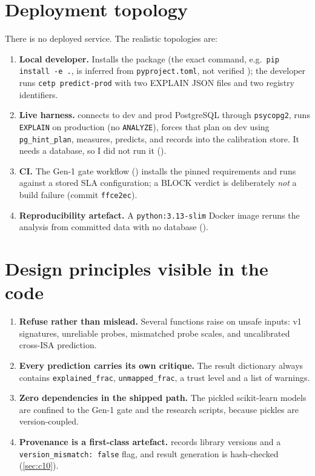 \section{Deployment topology}
There is no deployed service. The realistic topologies are:
\begin{enumerate}
\item \textbf{Local developer.} Installs the package (the exact command, e.g.\ \texttt{pip install -e .}, is inferred from \texttt{pyproject.toml}, not verified \evUNK); the developer runs \texttt{cetp predict-prod}
  with two EXPLAIN JSON files and two registry identifiers.
\item \textbf{Live harness.}  connects to dev and prod
  PostgreSQL through \texttt{psycopg2}, runs \texttt{EXPLAIN} on production (no \texttt{ANALYZE}), forces
  that plan on dev using \texttt{pg\_hint\_plan}, measures, predicts, and records into the calibration
  store. It needs a database, so I did not run it (\evUNK).
\item \textbf{CI.} The Gen-1 gate workflow () installs the pinned
  requirements and runs  against a stored SLA configuration; a BLOCK verdict is
  deliberately \emph{not} a build failure (commit \texttt{ffce2ec}).
\item \textbf{Reproducibility artefact.} A \texttt{python:3.13-slim} Docker image reruns the analysis
  from committed data with no database ().
\end{enumerate}

\section{Design principles visible in the code}
\begin{enumerate}
\item \textbf{Refuse rather than mislead.} Several functions raise on unsafe inputs: v1 signatures,
  unreliable probes, mismatched probe scales, and uncalibrated cross-ISA prediction.
\item \textbf{Every prediction carries its own critique.} The result dictionary always contains
  \texttt{explained\_frac}, \texttt{unmapped\_frac}, a trust level and a list of warnings.
\item \textbf{Zero dependencies in the shipped path.} The pickled scikit-learn models are confined to the
  Gen-1 gate and the research scripts, because pickles are version-coupled.
\item \textbf{Provenance is a first-class artefact.}  records
  library versions and a \texttt{version\_mismatch: false} flag, and result generation is hash-checked
  (\cref{sec:c10}).
\end{enumerate}
